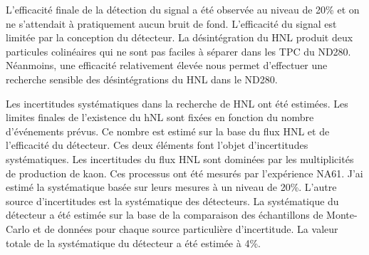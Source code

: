 \documentclass[../main.tex]{subfiles}
\begin{document}
L'efficacité finale de la détection du signal a été observée au niveau de 20\% et on ne s'attendait à pratiquement aucun bruit de fond. L'efficacité du signal est limitée par la conception du détecteur. La désintégration du HNL produit deux particules colinéaires qui ne sont pas faciles à séparer dans les TPC du ND280. Néanmoins, une efficacité relativement élevée nous permet d'effectuer une recherche sensible des désintégrations du HNL dans le ND280.



Les incertitudes systématiques dans la recherche de HNL ont été estimées. Les limites finales de l'existence du hNL sont fixées en fonction du nombre d'événements prévus. Ce nombre est estimé sur la base du flux HNL et de l'efficacité du détecteur. Ces deux éléments font l'objet d'incertitudes systématiques. Les incertitudes du flux HNL sont dominées par les multiplicités de production de kaon. Ces processus ont été mesurés par l'expérience NA61. J'ai estimé la systématique basée sur leurs mesures à un niveau de 20\%. L'autre source d'incertitudes est la systématique des détecteurs. La systématique du détecteur a été estimée sur la base de la comparaison des échantillons de Monte-Carlo et de données pour chaque source particulière d'incertitude. La valeur totale de la systématique du détecteur a été estimée à 4\%.


\end{document}
